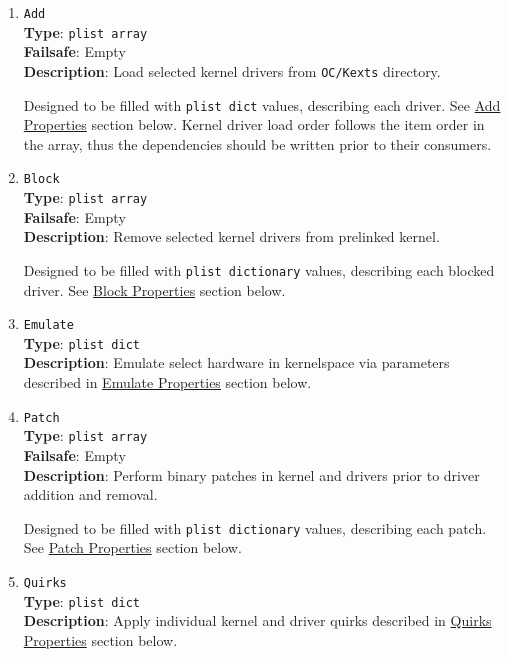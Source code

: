 \documentclass[]{article}
\begin{document}
\begin{enumerate}
\item
  \texttt{Add}\\
  \textbf{Type}: \texttt{plist\ array}\\
  \textbf{Failsafe}: Empty\\
  \textbf{Description}: Load selected kernel drivers from \texttt{OC/Kexts} directory.

  Designed to be filled with \texttt{plist\ dict} values, describing each driver.
  See \hyperref[kernelpropsadd]{Add Properties} section below. Kernel driver load
  order follows the item order in the array, thus the dependencies should be written
  prior to their consumers.

\item
  \texttt{Block}\\
  \textbf{Type}: \texttt{plist\ array}\\
  \textbf{Failsafe}: Empty\\
  \textbf{Description}: Remove selected kernel drivers from prelinked kernel.

  Designed to be filled with \texttt{plist\ dictionary} values, describing each
  blocked driver. See \hyperref[kernelpropsblock]{Block Properties} section below.

\item
  \texttt{Emulate}\\
  \textbf{Type}: \texttt{plist\ dict}\\
  \textbf{Description}: Emulate select hardware in kernelspace via parameters
  described in \hyperref[kernelpropsemu]{Emulate Properties} section below.

\item
  \texttt{Patch}\\
  \textbf{Type}: \texttt{plist\ array}\\
  \textbf{Failsafe}: Empty\\
  \textbf{Description}: Perform binary patches in kernel and drivers prior to
  driver addition and removal.

  Designed to be filled with \texttt{plist\ dictionary} values, describing each
  patch. See \hyperref[kernelpropspatch]{Patch Properties} section below.

\item
  \texttt{Quirks}\\
  \textbf{Type}: \texttt{plist\ dict}\\
  \textbf{Description}: Apply individual kernel and driver quirks described
  in \hyperref[kernelpropsquirks]{Quirks Properties} section below.

\end{enumerate}
\end{document}
